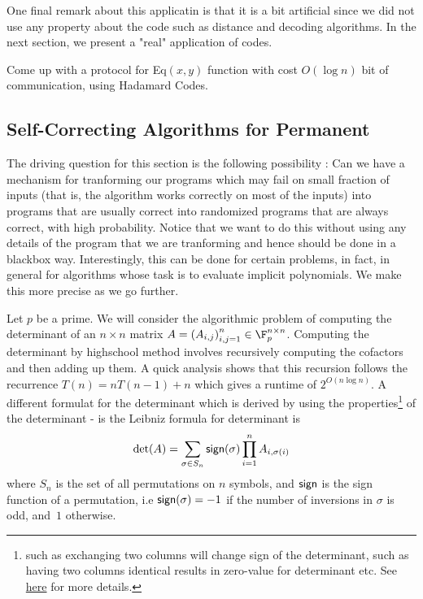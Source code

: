 One final remark about this applicatin is that it is a bit artificial since we did not use any property about the code such as distance and decoding algorithms. In the next section, we present a "real" application of codes.

\begin{exercise}
Come up with a protocol for {\sc Eq}$(x,y)$ function with cost $O(\log n)$ bit of communication, using Hadamard Codes.
\end{exercise}

\subsection{Self-Correcting Algorithms for Permanent}

The driving question for this section is the following possibility  : Can we have a mechanism for tranforming our programs which may fail on small fraction of inputs (that is, the algorithm works correctly on most of the inputs) into programs that are usually correct into randomized programs that are always correct, with high probability. Notice that we want to do this without using any details of the program that we are tranforming and hence should be done in a blackbox way. Interestingly, this can be done for certain problems, in fact, in general for algorithms whose task is to evaluate implicit polynomials. We make this more precise as we go further.

Let $p$ be a prime. We will consider the algorithmic problem of computing the determinant of an $n \times n$ matrix $A= \left(A_{i,j}\right)_{i,j=1}^{n}\in \F_p^{n \times n}$. Computing the determinant by highschool method involves recursively computing the cofactors and then adding up them. A quick analysis shows that this recursion follows the recurrence $T(n) = nT(n-1)+n$ which gives a runtime of $2^{O(n\log n)}$. A different formulat for the determinant which is derived by using the properties\footnote{such as exchanging two columns will change sign of the determinant, such as having two columns identical results in zero-value for determinant etc. See \href{https://en.wikipedia.org/wiki/Leibniz\_formula\_for\_determinants}{here} for more details.} of the determinant - is the Leibniz formula for determinant is
\begin{equation}
\det(A) = \sum_{\sigma\in S_n}{\sf sign}(\sigma)
\prod_{i=1}^n A_{i,\sigma(i)}
\label{eqn:leibnis}
\end{equation}
where $S_n$ is the set of all permutations on $n$ symbols, and ${\sf sign}$ is the sign function of a permutation, i.e ${\sf sign} (\sigma) = -1$ if the number of inversions in $\sigma$ is odd, and~$1$ otherwise.

